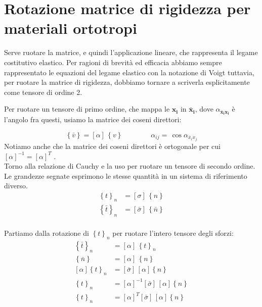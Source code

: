 \section{Rotazione matrice di rigidezza per materiali ortotropi}

Serve ruotare la matrice, e quindi l'applicazione lineare, che rappresenta il legame costitutivo elastico. Per ragioni di brevità ed efficacia abbiamo sempre rappresentato le equazioni del legame elastico con la notazione di Voigt tuttavia, per ruotare la matrice di rigidezza, dobbiamo tornare a scriverla esplicitamente come tensore di ordine 2.

Per ruotare un tensore di primo ordine, che mappa le $\boldsymbol{x_i}$ in $\boldsymbol{\bar{x}_i}$, dove $\alpha_{\boldsymbol{\bar{x}_i} \boldsymbol{x_i}}$ è l'angolo fra questi, usiamo la matrice dei coseni direttori:

    \begin{equation*}
\left\{ \bar{v}\right\}
=\left[\alpha\right]\,\left\{ v\right\} \qquad\qquad \alpha_{ij}=\, \cos{\alpha_{\bar{x}_ix_j}}
\end{equation*}
Notiamo anche che la matrice dei coseni direttori è ortogonale per cui $[\alpha]^{-1}=[\alpha]^T $ .\\

Torno alla relazione di Cauchy e la uso per ruotare un tensore di secondo ordine. Le grandezze segnate esprimono le stesse quantità in un sistema di riferimento diverso.
\begin{align*}
\left\{ t\right\}_n&=\left[\sigma\right]\,\left\{n\right\}\\
\left\{ \bar{t}\right\}_n&=\left[\bar{\sigma}\right]\,\left\{\bar{n}\right\}\\
\end{align*}

Partiamo dalla rotazione di $\left\{ t\right\}_n$ per ruotare l'intero tensore degli sforzi:
\begin{align*}
\left\{ \bar{t}\right\}_n&=\left[\alpha\right]\,\left\{t\right\}_n\\
\left\{ \bar{n}\right\}&=\left[\alpha\right]\,\left\{n\right\}\\
\left[\alpha\right]\left\{ t\right\}_n&=\left[\bar{\sigma}\right]\,\left[\alpha\right]\left\{n\right\}\\
\left\{ t\right\}_n&=\left[\alpha\right]^{-1}\left[\bar{\sigma}\right]\,\left[\alpha\right]\left\{n\right\}\\
\left\{ t\right\}_n&=\left[\alpha\right]^T\left[\bar{\sigma}\right]\,\left[\alpha\right]\left\{n\right\}\\
\end{align*}

